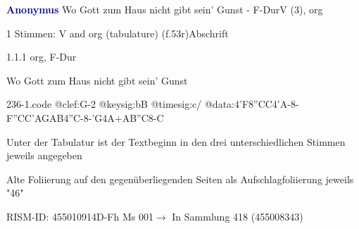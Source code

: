 \documentclass[twocolumn, 12pt]{book}
\begin{document}
\par \vspace{16pt} \textcolor{darkblue}{\textbf{Anonymus  }}\hfillplus{\textbf{[236]}}\newline Wo Gott zum Haus nicht gibt sein' Gunst - F-Dur\newline V (3), org
\par \begin{itshape}\end{itshape} 
\par \textcolor{darkblue}{}  1 Stimmen: V and org (tabulature)  (f.53r)\newline Abschrift
\par 1.1.1  org, F-Dur\newline \begin{footnotesize} Wo Gott zum Haus nicht gibt sein' Gunst \end{footnotesize}  
\begin{filecontents*}{236-1.code}
@clef:G-2
@keysig:bB
@timesig:c/
@data:4'F{8''CC}4'A-8-F{''CC}{'AGAB}4''C-8-'G4A+AB''C8-C
\end{filecontents*}
\newline %
\par Unter der Tabulatur ist der Textbeginn in den drei unterschiedlichen Stimmen jeweils angegeben
\par Alte Foliierung auf den gegenüberliegenden Seiten als Aufschlagfoliierung jeweils "46"
\par RISM-ID: 455010914\newline D-Fh  Ms 001\newline $\rightarrow$ In Sammlung 418 (455008343)
      
\end{document}
